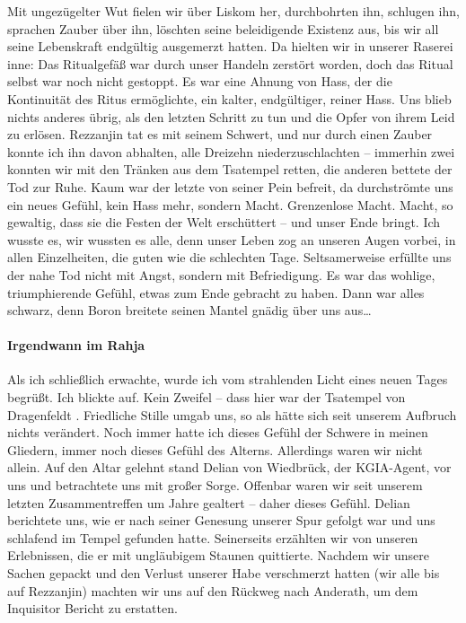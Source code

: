 Mit ungezügelter Wut fielen wir über Liskom her, durchbohrten ihn, schlugen ihn, sprachen Zauber über ihn, löschten seine beleidigende Existenz aus, bis wir all seine Lebenskraft endgültig ausgemerzt hatten. Da hielten wir in unserer Raserei inne: Das Ritualgefäß war durch unser Handeln zerstört worden, doch das Ritual selbst war noch nicht gestoppt. Es war eine Ahnung von Hass, der die Kontinuität des Ritus ermöglichte, ein kalter, endgültiger, reiner Hass. Uns blieb nichts anderes übrig, als den letzten Schritt zu tun und die Opfer von ihrem Leid zu erlösen. Rezzanjin tat es mit seinem Schwert, und nur durch einen Zauber konnte ich ihn davon abhalten, alle Dreizehn niederzuschlachten -- immerhin zwei konnten wir mit den Tränken aus dem Tsatempel retten, die anderen bettete der Tod zur Ruhe. Kaum war der letzte von seiner Pein befreit, da durchströmte uns ein neues Gefühl, kein Hass mehr, sondern Macht. Grenzenlose Macht. Macht, so gewaltig, dass sie die Festen der Welt erschüttert -- und unser Ende bringt. Ich wusste es, wir wussten es alle, denn unser Leben zog an unseren Augen vorbei, in allen Einzelheiten, die guten wie die schlechten Tage. Seltsamerweise erfüllte uns der nahe Tod nicht mit Angst, sondern mit Befriedigung. Es war das wohlige, triumphierende Gefühl, etwas zum Ende gebracht zu haben. Dann war alles schwarz, denn Boron breitete seinen Mantel gnädig über uns aus\dots

\paragraph{Irgendwann im Rahja}
Als ich schließlich erwachte, wurde ich vom strahlenden Licht eines neuen Tages begrüßt. Ich blickte auf. Kein Zweifel -- dass hier war der Tsatempel von Dragenfeldt . Friedliche Stille umgab uns, so als hätte sich seit unserem Aufbruch nichts verändert. Noch immer hatte ich dieses Gefühl der Schwere in meinen Gliedern, immer noch dieses Gefühl des Alterns. Allerdings waren wir nicht allein. Auf den Altar gelehnt stand Delian von Wiedbrück, der KGIA-Agent, vor uns und betrachtete uns mit großer Sorge. Offenbar waren wir seit unserem letzten Zusammentreffen um Jahre gealtert -- daher dieses Gefühl. Delian berichtete uns, wie er nach seiner Genesung unserer Spur gefolgt war und uns schlafend im Tempel gefunden hatte. Seinerseits erzählten wir von unseren Erlebnissen, die er mit ungläubigem Staunen quittierte. Nachdem wir unsere Sachen gepackt und den Verlust unserer Habe verschmerzt hatten (wir alle bis auf Rezzanjin) machten wir uns auf den Rückweg nach Anderath, um dem Inquisitor Bericht zu erstatten.

